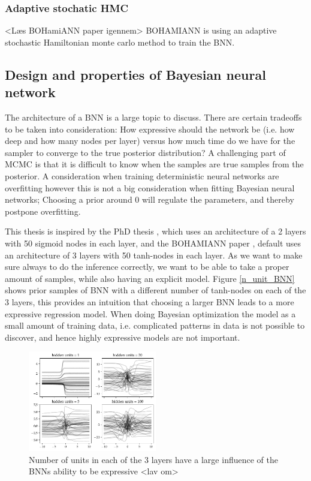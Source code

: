 \subsubsection{Adaptive stochatic HMC}
<Læs BOHamiANN paper igennem>
BOHAMIANN is using an adaptive stochastic Hamiltonian monte carlo method to train the BNN. 


\subsection{Design and properties of Bayesian neural network}
The architecture of a BNN is a large topic to discuss. There are certain tradeoffs to be taken into
consideration: How expressive should the network be (i.e. how deep and how many nodes per layer)
versus how much time do we have for the sampler to converge to the true posterior distribution? A
challenging part of MCMC is that it is difficult to know when the samples are true samples from the
posterior. A consideration when training deterministic neural networks are overfitting however this
is not a big consideration when fitting Bayesian neural networks; Choosing a prior around 0 will
regulate the parameters, and thereby postpone overfitting. 

This thesis is inspired by the PhD thesis \cite{PhDthesis}, which uses an architecture of a 2 layers
with 50 sigmoid nodes in each layer, and the BOHAMIANN paper \cite{BOHAMIANN}, default uses an architecture
of 3 layers with 50 tanh-nodes in each layer. As we want to make sure always to do the 
inference correctly, we want to be able to take a proper amount of samples, while also
having an explicit model. Figure \eqref{n_unit_BNN} shows prior samples of BNN with a different
number of tanh-nodes on each of the 3 layers, this provides an intuition that choosing a larger
BNN leads to a more expressive regression model. When doing Bayesian optimization the model as a small
amount of training data, i.e. complicated patterns in data is not possible to discover, and hence 
highly expressive models are not important. 

\begin{figure}[H]
    \centering
    \includegraphics[width=0.5\textwidth]{Pictures/bayesian_nn_prior_samples_hidden_units.pdf}
    \caption{Number of units in each of the 3 layers have a large influence of the BNNs ability to be expressive <lav om>}
    \label{n_unit_BNN}
\end{figure}

